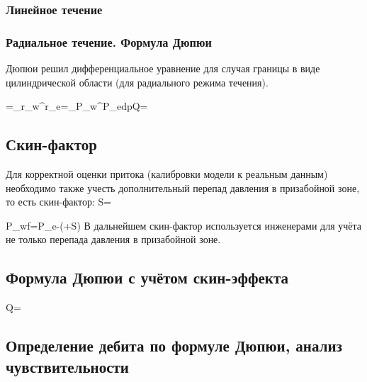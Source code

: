\documentclass[main.tex]{subfiles}
\begin{document}
\subsubsection{Линейное течение}


\subsubsection{Радиальное течение. Формула Дюпюи}

Дюпюи решил дифференциальное уравнение для случая границы в виде цилиндрической области (для радиального режима течения).

\beq
{}=\Rightarrow{}\int\limits_{r_w}^{r_e}{}=\int\limits_{P_w}^{P_e}{dp}\Rightarrow Q=
\eeq

\subsection{Скин-фактор}

Для корректной оценки притока (калибровки модели к реальным данным) необходимо также учесть дополнительный перепад давления в призабойной зоне, то есть скин-фактор:
\beq
S=
\eeq

\beq
P_{wf}=P_e-\left(+S\right)
\eeq
В дальнейшем скин-фактор используется инженерами для учёта не только перепада давления в призабойной зоне.


\subsection{Формула Дюпюи с учётом скин-эффекта}

\beq
Q=
\eeq

\subsection{Определение дебита по формуле Дюпюи, анализ чувствительности}
\end{document}
